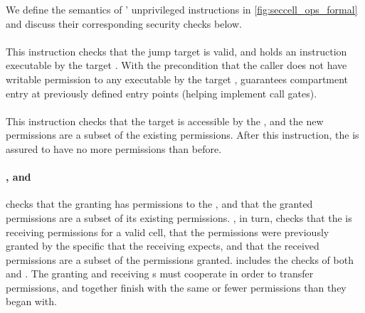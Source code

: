 We define the semantics of \seccells' unprivileged instructions
in \autoref{fig:seccell_ops_formal} and discuss their corresponding
security checks below.

\paragraph{\sdswitch}
This instruction checks that the jump target is valid, and holds
an \sdentry instruction executable by the target \secdiv.
With the precondition that the caller \secdiv does not have
writable permission to any \cell executable by the target \secdiv,
\sdswitch guarantees compartment entry at previously defined entry 
points (helping implement call gates). 

\paragraph{\scprot}
This instruction checks that the target \cell is accessible by the
\secdiv, and the new permissions are a subset of the existing permissions.
After this instruction, the \secdiv is assured to have no more permissions
than before.

\paragraph{\scgrant, \screcv and \sctfer}
\scgrant checks that the granting \secdiv has permissions to the
\cell, and that the granted permissions are a subset of its existing
permissions.
\screcv, in turn, checks that the \secdiv is receiving permissions for a
valid cell, that the permissions were previously granted by the
specific \secdiv that the receiving \secdiv expects, and that the received
permissions are a subset of the permissions granted.
\sctfer includes the checks of both \scgrant and \scprot.
The granting and receiving \secdiv{}s must cooperate in order to
transfer permissions, and together finish with the same or fewer
permissions than they began with.

